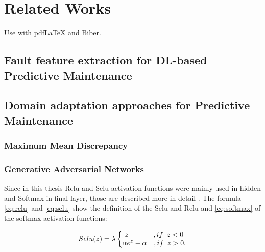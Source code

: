 
\chapter{Related Works}\label{chapter:related_works}
Use with pdfLaTeX and Biber.

\section{Fault feature extraction for DL-based Predictive Maintenance}
\section{Domain adaptation approaches for Predictive Maintenance}

\subsection{Maximum Mean Discrepancy}
\subsection{Generative Adversarial Networks}

Since in this thesis Relu and Selu activation functions were mainly used in hidden and Softmax in final layer, those are described more in detail . The formula \ref{eq:relu} and \ref{eq:selu} show the definition of the Selu and Relu and \ref{eq:softmax} of the softmax activation functions: 

\begin{equation}
Selu(z) = \lambda
\left\{
\begin{matrix}
z \hspace{3.5em}, if \enspace z < 0\\
\alpha e^{z} - \alpha  \hspace{1em}, if \enspace z > 0.
\end{matrix}
\right.
\label{eq:selu}
\end{equation}

